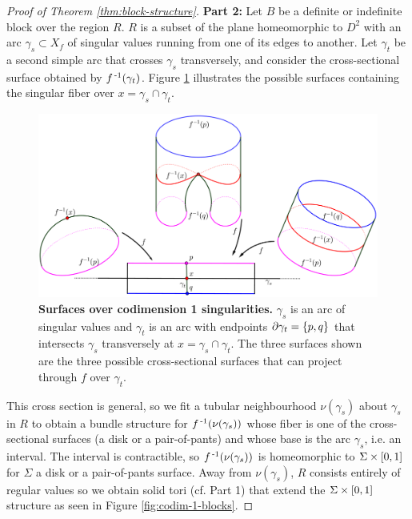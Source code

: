 \begin{proof}[Proof of Theorem \ref{thm:block-structure}]
	\textbf{Part 2:}
	Let $B$ be a definite or indefinite block over the region $R$.
	$R$ is a subset of the plane homeomorphic to $D^2$ with an arc $\gamma_s \subset X_f$ of singular values running from one of its edges to another.
	Let $\gamma_t$ be a second simple arc that crosses $\gamma_s$ transversely, and consider the cross-sectional surface obtained by $f^{\,\text{-}1}(\gamma_t)$.
	Figure \ref{fig:codim-1-surfaces} illustrates the possible surfaces containing the singular fiber over $x=\gamma_s\cap\gamma_t$.
	
	\begin{figure}[h!]
		\centering
		\includegraphics[width=\textwidth]{figures/codim-1-surfaces.png}
		\caption{
			\textbf{Surfaces over codimension 1 singularities.}
			$\gamma_s$ is an arc of singular values and $\gamma_t$ is an arc with endpoints $\partial\gamma_t = \{p,q\}$ that intersects $\gamma_s$ transversely at $x=\gamma_s\cap\gamma_t$.
			The three surfaces shown are the three possible cross-sectional surfaces that can project through $f$ over $\gamma_t$.
		}
		\label{fig:codim-1-surfaces}
	\end{figure}
	
	This cross section is general, so we fit a tubular neighbourhood $\nu(\gamma_s)$ about $\gamma_s$ in $R$ to obtain a bundle structure for $f^{\,\text{-}1}(\nu(\gamma_s))$ whose fiber is one of the cross-sectional surfaces (a disk or a pair-of-pants) and whose base is the arc $\gamma_s$, i.e. an interval.
	The interval is contractible, so $f^{\,\text{-}1}(\nu(\gamma_s))$ is homeomorphic to $\Sigma\times[0,1]$ for $\Sigma$ a disk or a pair-of-pants surface.
	Away from $\nu(\gamma_s)$, $R$ consists entirely of regular values so we obtain solid tori (cf. Part 1) that extend the $\Sigma\times[0,1]$ structure as seen in Figure \ref{fig:codim-1-blocks}.
		

\end{proof}
